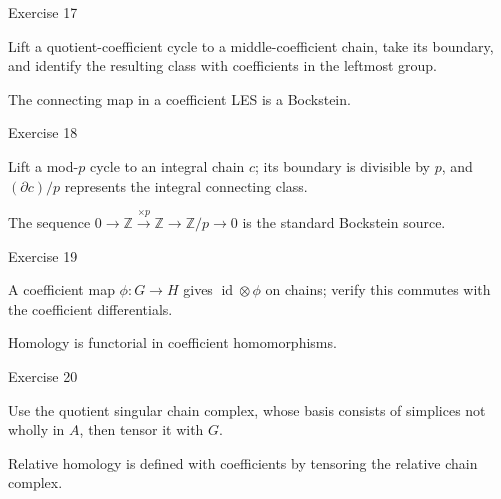 \begin{exercise}\label{exr:viii25-17}
Exercise 17
\end{exercise}
\begin{hint}
Lift a quotient-coefficient cycle to a middle-coefficient chain, take its boundary, and identify the resulting class with coefficients in the leftmost group.
\end{hint}
\begin{solution}
The connecting map in a coefficient LES is a Bockstein.
\end{solution}

\begin{exercise}\label{exr:viii25-18}
Exercise 18
\end{exercise}
\begin{hint}
Lift a mod-\(p\) cycle to an integral chain \(c\); its boundary is divisible by \(p\), and \((\partial c)/p\) represents the integral connecting class.
\end{hint}
\begin{solution}
The sequence \(0\to\mathbb Z\xrightarrow{\times p}\mathbb Z\to\mathbb Z/p\to0\) is the standard Bockstein source.
\end{solution}

\begin{exercise}\label{exr:viii25-19}
Exercise 19
\end{exercise}
\begin{hint}
A coefficient map \(\phi:G\to H\) gives \(\operatorname{id}\otimes\phi\) on chains; verify this commutes with the coefficient differentials.
\end{hint}
\begin{solution}
Homology is functorial in coefficient homomorphisms.
\end{solution}

\begin{exercise}\label{exr:viii25-20}
Exercise 20
\end{exercise}
\begin{hint}
Use the quotient singular chain complex, whose basis consists of simplices not wholly in \(A\), then tensor it with \(G\).
\end{hint}
\begin{solution}
Relative homology is defined with coefficients by tensoring the relative chain complex.
\end{solution}

